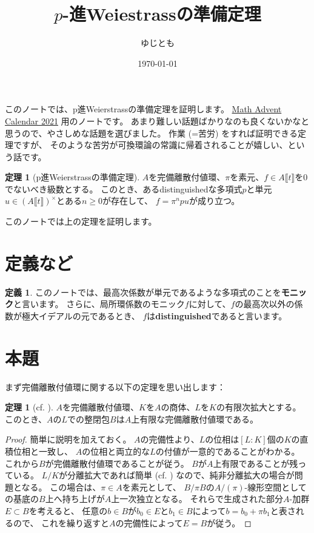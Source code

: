\documentclass[uplatex]{jsarticle}
\title{\(p\)-進Weiestrassの準備定理}
\date{\today}
\author{ゆじとも}
\theoremstyle{definition}
\newtheorem{thm}{定理}[section]
\newtheorem{defi}[defi]{定義}
\newtheorem*{thm*}{定理}
\newcommand{\lb}[1]{\llbracket #1\rrbracket}
\begin{document}
\maketitle





このノートでは、p進Weierstrassの準備定理を証明します。
\href{https://adventar.org/calendars/6146}{Math Advent Calendar 2021}
用のノートです。
あまり難しい話題ばかりなのも良くないかなと思うので、やさしめな話題を選びました。
作業 (=苦労) をすれば証明できる定理ですが、
そのような苦労が可換環論の常識に帰着されることが嬉しい、という話です。


\begin{thm*}[p進Weierstrassの準備定理]
  \(A\)を完備離散付値環、\(\pi\)を素元、\(f\in A\lb{t}\)を\(0\)でないべき級数とする。
  このとき、あるdistinguishedな多項式\(p\)と単元\(u\in (A\lb{t})^{\times}\)とある\(n\geq 0\)が存在して、
  \(f = \pi^npu\)が成り立つ。
\end{thm*}

このノートでは上の定理を証明します。



\section{定義など}


\begin{defi}
  このノートでは、最高次係数が単元であるような多項式のことを\textbf{モニック}と言います。
  さらに、局所環係数のモニック\(f\)に対して、\(f\)の最高次以外の係数が極大イデアルの元であるとき、
  \(f\)は\textbf{distinguished}であると言います。
\end{defi}




\section{本題}


まず完備離散付値環に関する以下の定理を思い出します：

\begin{thm}[{cf. \cite[II. Proposition 3]{Serre}}]\label{loc flds thm}
  \(A\)を完備離散付値環、\(K\)を\(A\)の商体、\(L\)を\(K\)の有限次拡大とする。
  このとき、\(A\)の\(L\)での整閉包\(B\)は\(A\)上有限な完備離散付値環である。
\end{thm}

\begin{proof}
  簡単に説明を加えておく。
  \(A\)の完備性より、\(L\)の位相は\([L:K]\)個の\(K\)の直積位相と一致し、
  \(A\)の位相と両立的な\(L\)の付値が一意的であることがわかる。
  これから\(B\)が完備離散付値環であることが従う。
  \(B\)が\(A\)上有限であることが残っている。
  \(L/K\)が分離拡大であれば簡単 (cf. \cite[命題5.17]{AM}) なので、純非分離拡大の場合が問題となる。
  この場合は、\(\pi\in A\)を素元として、
  \(B/\pi B\)の\(A/(\pi)\)-線形空間としての基底の\(B\)上へ持ち上げが\(A\)上一次独立となる。
  それらで生成された部分\(A\)-加群\(E\subset B\)を考えると、
  任意の\(b\in B\)が\(b_0\in E\)と\(b_1\in B\)によって\(b=b_0+\pi b_1\)と表されるので、
  これを繰り返すと\(A\)の完備性によって\(E=B\)が従う。
\end{proof}
\end{document}
